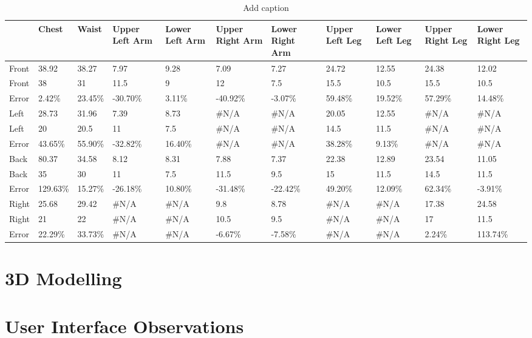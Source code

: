 \begin{table}[htbp]
	\centering
	\caption{Add caption}
	\begin{tabularx}{\textwidth}{|X|X|X|X|X|X|X|X|X|X|X|}
		\toprule
		& Chest & Waist & Upper Left Arm & Lower Left Arm & Upper Right Arm & Lower Right Arm & Upper Left Leg & Lower Left Leg & Upper Right Leg & Lower Right Leg \\
		\midrule
		\rowcolor[rgb]{ .573,  .816,  .314} Front & 38.92 & 38.27 & 7.97  & 9.28  & 7.09  & 7.27  & 24.72 & 12.55 & 24.38 & 12.02 \\
		\midrule
		\rowcolor[rgb]{ 0,  .69,  .941} Front & 38    & 31    & 11.5  & 9     & 12    & 7.5   & 15.5  & 10.5  & 15.5  & 10.5 \\
		\midrule
		Error & 2.42\% & 23.45\% & -30.70\% & 3.11\% & -40.92\% & -3.07\% & 59.48\% & 19.52\% & 57.29\% & 14.48\% \\
		\midrule
		\rowcolor[rgb]{ .573,  .816,  .314} Left  & 28.73 & 31.96 & 7.39  & 8.73  & \#N/A & \#N/A & 20.05 & 12.55 & \#N/A & \#N/A \\
		\midrule
		\rowcolor[rgb]{ 0,  .69,  .941} Left  & 20    & 20.5  & 11    & 7.5   & \#N/A & \#N/A & 14.5  & 11.5  & \#N/A & \#N/A \\
		\midrule
		Error & 43.65\% & 55.90\% & -32.82\% & 16.40\% & \#N/A & \#N/A & 38.28\% & 9.13\% & \#N/A & \#N/A \\
		\midrule
		\rowcolor[rgb]{ .573,  .816,  .314} Back  & 80.37 & 34.58 & 8.12  & 8.31  & 7.88  & 7.37  & 22.38 & 12.89 & 23.54 & 11.05 \\
		\midrule
		\rowcolor[rgb]{ 0,  .69,  .941} Back  & 35    & 30    & 11    & 7.5   & 11.5  & 9.5   & 15    & 11.5  & 14.5  & 11.5 \\
		\midrule
		Error & 129.63\% & 15.27\% & -26.18\% & 10.80\% & -31.48\% & -22.42\% & 49.20\% & 12.09\% & 62.34\% & -3.91\% \\
		\midrule
		\rowcolor[rgb]{ .573,  .816,  .314} Right & 25.68 & 29.42 & \#N/A & \#N/A & 9.8   & 8.78  & \#N/A & \#N/A & 17.38 & 24.58 \\
		\midrule
		\rowcolor[rgb]{ 0,  .69,  .941} Right & 21    & 22    & \#N/A & \#N/A & 10.5  & 9.5   & \#N/A & \#N/A & 17    & 11.5 \\
		\midrule
		Error & 22.29\% & 33.73\% & \#N/A & \#N/A & -6.67\% & -7.58\% & \#N/A & \#N/A & 2.24\% & 113.74\% \\
		\bottomrule
	\end{tabularx}%
	\label{tab:testTable}%
\end{table}%

\section{3D Modelling}

\section{User Interface Observations}
